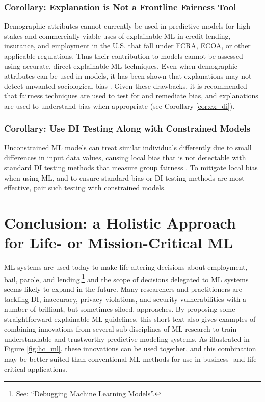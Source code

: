 \documentclass{article}
\begin{document}
\subsubsection{Corollary: Explanation is Not a Frontline Fairness Tool} Demographic attributes cannot currently be used in predictive models for high-stakes and commercially viable uses of explainable ML in credit lending, insurance, and employment in the U.S. that fall under FCRA, ECOA, or other applicable regulations. Thus their contribution to models cannot be assessed using accurate, direct explainable ML techniques. Even when demographic attributes can be used in models, it has been shown that explanations may not detect unwanted sociological bias \cite{fair_washing}. Given these drawbacks, it is recommended that fairness techniques are used to test for and remediate bias, and explanations are used to understand bias when appropriate (see Corollary \ref{cor:ex_di}).  

\subsubsection{Corollary: Use DI Testing Along with Constrained Models} \label{cor:di_con}

Unconstrained ML models can treat similar individuals differently due to small differences in input data values, causing local bias that is not detectable with standard DI testing methods that measure group fairness \cite{dwork2012fairness}. To mitigate local bias when using ML, and to ensure standard bias or DI testing methods are most effective, pair such testing with constrained models.

\section{Conclusion: a Holistic Approach for Life- or Mission-Critical ML} \label{sec:conclusion}

ML systems are used today to make life-altering decisions about employment, bail, parole, and lending,\footnote{\scriptsize{See: \href{https://debug-ml-iclr2019.github.io/}{``Debugging Machine Learning Models''}.}} and the scope of decisions delegated to ML systems seems likely to expand in the future. Many researchers and practitioners are tackling DI, inaccuracy, privacy violations, and security vulnerabilities with a number of brilliant, but sometimes siloed, approaches. By proposing some straightforward explainable ML guidelines, this short text also gives examples of combining innovations from several sub-disciplines of ML research to train understandable and trustworthy predictive modeling systems. As illustrated in Figure \ref{fig:hc_ml}, these innovations can be used together, and this combination may be better-suited than conventional ML methods for use in business- and life-critical applications.
\end{document}

